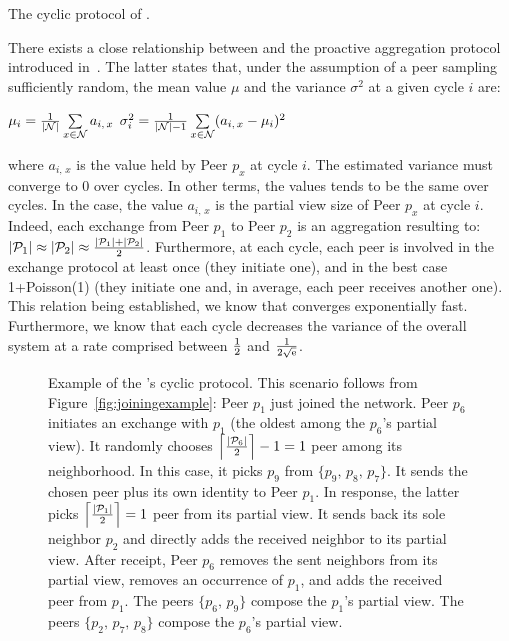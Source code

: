 \begin{algorithm}[b] %
  
  \caption{\label{algo:scamplon}The cyclic protocol of \SCAMPLON{}.}
\end{algorithm}

There exists a close relationship between \SCAMPLON{} and the proactive
aggregation protocol introduced
in~\cite{jelasity2004epidemic,montresor2004robust}. The latter states that,
under the assumption of a peer sampling sufficiently random, the mean value
$\mu$ and the variance $\sigma^2$ at a given cycle $i$ are:
\begin{center}
  $\mu_i = {1\over{|\mathcal{N}|}} \sum\limits_{x \in \mathcal{N}} a_{i,\,x}$
  \hfill
  $\sigma^2_i = {1\over{|\mathcal{N}|-1}}\sum\limits_{x \in \mathcal{N}}
  (a_{i,\,x} - \mu_i)^2$
\end{center}
where $a_{i,\,x}$ is the value held by Peer $p_x$ at cycle $i$. The estimated
variance must converge to $0$ over cycles. In other terms, the values tends to
be the same over cycles. In the \SCAMPLON{} case, the value $a_{i,\,x}$ is the
partial view size of Peer $p_x$ at cycle $i$. Indeed, each exchange from Peer
$p_1$ to Peer $p_2$ is an aggregation resulting to:
$|\mathcal{P}_1|\approx|\mathcal{P}_2|\approx{|\mathcal{P}_1| + |\mathcal{P}_2|
  \over{2}}$.
Furthermore, at each cycle, each peer is involved in the exchange protocol at
least once (they initiate one), and in the best case 1+Poisson(1) (they
initiate one and, in average, each peer receives another one). This
relation being established, we know that \SCAMPLON{} converges exponentially
fast. Furthermore, we know that each cycle decreases the variance of the
overall system at a rate comprised between ${1\over{2}}$ and
$1\over{2\sqrt{\text{e}}}$.


\begin{figure}
  \centering
  
  \caption{\label{fig:cyclicexample}Example of the \SCAMPLON{}'s cyclic
    protocol. This scenario follows from Figure~\ref{fig:joiningexample}: Peer
    $p_1$ just joined the network. Peer $p_6$ initiates an exchange with $p_1$
    (the oldest among the $p_6$'s partial view). It randomly chooses
    $\left\lceil{|\mathcal{P}_6|\over{2}}\right\rceil-1 = 1$ peer among its
    neighborhood. In this case, it picks $p_9$ from $\{p_9,\,p_8,\,p_7\}$.  It
    sends the chosen peer plus its own identity to Peer $p_1$. In response, the
    latter picks $\left\lceil{|\mathcal{P}_1|\over{2}}\right\rceil = 1$ peer
    from its partial view. It sends back its sole neighbor $p_2$ and directly
    adds the received neighbor to its partial view. After receipt, Peer $p_6$
    removes the sent neighbors from its partial view, removes an occurrence of
    $p_1$, and adds the received peer from $p_1$. The peers $\{p_6,\,p_9\}$
    compose the $p_1$'s partial view. The peers $\{p_2,\,p_7,\,p_8\}$ compose
    the $p_6$'s partial view.}
\end{figure}


